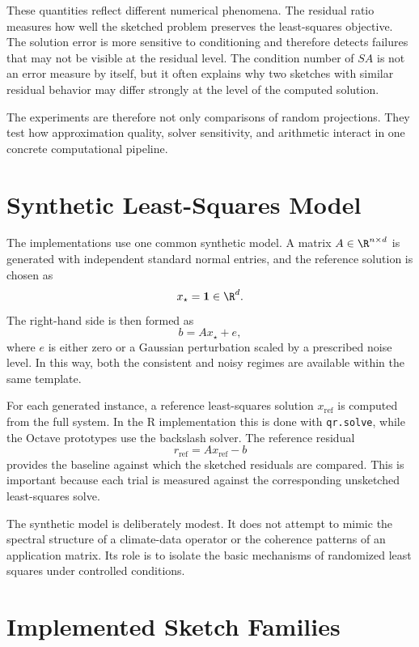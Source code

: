 These quantities reflect different numerical phenomena. The residual ratio
measures how well the sketched problem preserves the least-squares objective. The
solution error is more sensitive to conditioning and therefore detects failures that
may not be visible at the residual level. The condition number of \(SA\) is not an
error measure by itself, but it often explains why two sketches with similar
residual behavior may differ strongly at the level of the computed solution.

The experiments are therefore not only comparisons of random projections. They
test how approximation quality, solver sensitivity, and arithmetic interact in one
concrete computational pipeline.

\section{Synthetic Least-Squares Model}
\label{sec:synth_ls_model}

The implementations use one common synthetic model. A matrix
\(A \in \R^{n \times d}\) is generated with independent standard normal entries,
and the reference solution is chosen as
\[
	x_\star = \mathbf{1} \in \R^d.
\]
The right-hand side is then formed as
\[
	b = Ax_\star + e,
\]
where \(e\) is either zero or a Gaussian perturbation scaled by a prescribed noise
level. In this way, both the consistent and noisy regimes are available within the
same template.

For each generated instance, a reference least-squares solution \(x_{\mathrm{ref}}\) is
computed from the full system. In the R implementation this is done with
\texttt{qr.solve}, while the Octave prototypes use the backslash solver. The
reference residual
\[
	r_{\mathrm{ref}} = A x_{\mathrm{ref}} - b
\]
provides the baseline against which the sketched residuals are compared. This is
important because each trial is measured against the corresponding unsketched
least-squares solve.

The synthetic model is deliberately modest. It does not attempt to mimic the
spectral structure of a climate-data operator or the coherence patterns of an
application matrix. Its role is to isolate the basic mechanisms of randomized least
squares under controlled conditions.

\section{Implemented Sketch Families}

